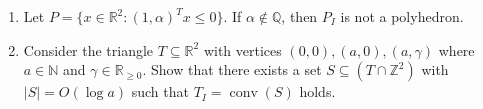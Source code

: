 \documentclass[11pt,a4paper]{article}
\DeclareMathOperator{\conv}{conv}
\begin{document}
\begin{enumerate}
\item Let $P = \{ x ∈ ℝ^2 : (1,α)^T x ≤ 0\}$. If $α ∉ ℚ$, then $P_I$ is not a polyhedron.





\item Consider the triangle $T ⊆ ℝ^2$ with vertices $(0,0), (a,0), (a, γ)$  where $a ∈ ℕ$ and $γ ∈ ℝ_{≥0}$. Show that there exists a set $S⊆ (T ∩ℤ^2)$ with $|S| = O(\log a)$ such that $T_I = \conv(S)$ holds.

\end{enumerate}



%
%


 
\end{document}
